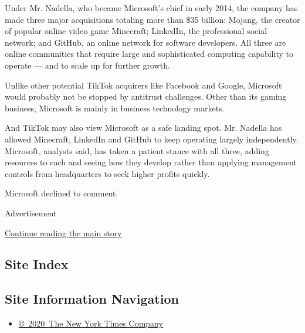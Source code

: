 Under Mr. Nadella, who became Microsoft's chief in early 2014, the
company has made three major acquisitions totaling more than \$35
billion: Mojang, the creator of popular online video game Minecraft;
LinkedIn, the professional social network; and GitHub, an online network
for software developers. All three are online communities that require
large and sophisticated computing capability to operate --- and to scale
up for further growth.

Unlike other potential TikTok acquirers like Facebook and Google,
Microsoft would probably not be stopped by antitrust challenges. Other
than its gaming business, Microsoft is mainly in business technology
markets.

And TikTok may also view Microsoft as a safe landing spot. Mr. Nadella
has allowed Minecraft, LinkedIn and GitHub to keep operating largely
independently. Microsoft, analysts said, has taken a patient stance with
all three, adding resources to each and seeing how they develop rather
than applying management controls from headquarters to seek higher
profits quickly.

Microsoft declined to comment.

Advertisement

\protect\hyperlink{after-bottom}{Continue reading the main story}

\hypertarget{site-index}{%
\subsection{Site Index}\label{site-index}}

\hypertarget{site-information-navigation}{%
\subsection{Site Information
Navigation}\label{site-information-navigation}}

\begin{itemize}
\tightlist
\item
  \href{https://help.nytimes.com/hc/en-us/articles/115014792127-Copyright-notice}{©~2020~The
  New York Times Company}
\end{itemize}

